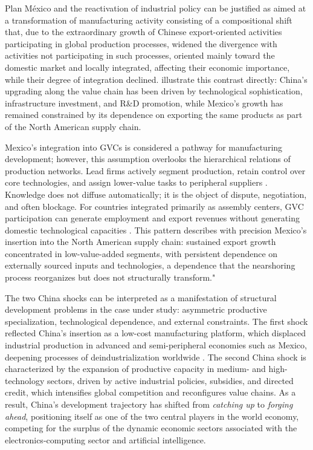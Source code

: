 \documentclass[11pt]{article}
\begin{document}
Plan México and the reactivation of industrial policy can be justified
as aimed at a transformation of manufacturing activity
consisting of a compositional shift that, due to the extraordinary
growth of Chinese export-oriented activities participating in global production
processes, widened the divergence with activities not participating in
such processes, oriented mainly toward the domestic market and locally
integrated, affecting their economic importance, while their degree of integration declined\citep{Xing2018}. \citet{KehoeXu2025} illustrate this contrast directly: China's upgrading along the value chain has been driven by technological sophistication, infrastructure investment, and R\&D promotion, while Mexico's growth has remained constrained by its dependence on exporting the same products as part of the North American supply chain.

Mexico's integration into GVCs is considered a pathway for manufacturing development; however, this assumption overlooks the hierarchical relations of production networks. Lead firms actively segment production, retain control over core technologies, and assign lower-value tasks to peripheral suppliers \citep{GereffiHumphreySturgeon2005,Sandoval2019}. Knowledge does not diffuse automatically; it is the object of dispute, negotiation, and often blockage. For countries integrated primarily as assembly centers, GVC participation can generate employment and export revenues without generating domestic technological capacities \citep{HumphreySChmitz2002}. This pattern describes with precision Mexico's insertion into the North American supply chain: sustained export growth concentrated in low-value-added segments, with persistent dependence on externally sourced inputs and technologies, a dependence that the nearshoring process reorganizes but does not structurally transform."

The two China shocks can be interpreted as a manifestation of structural
development problems in the case under study: asymmetric productive
specialization, technological dependence, and external constraints. The first shock reflected China's insertion as a low-cost manufacturing platform, which displaced industrial production in advanced and
semi-peripheral economies such as Mexico, deepening processes of
deindustrialization worldwide \citep{Autor2021}. The second China shock
is characterized by the expansion of productive capacity in medium- and
high-technology sectors, driven by active industrial policies, subsidies,
and directed credit, which intensifies global competition and reconfigures
value chains. As a result, China's development trajectory has shifted from
\textit{catching up} to \textit{forging ahead}, positioning itself as
one of the two central players in the world economy, competing for the
surplus of the dynamic economic sectors associated with the
electronics-computing sector and artificial intelligence.
\end{document}
